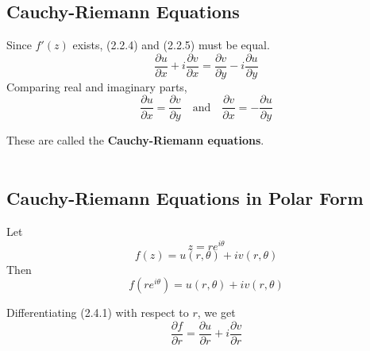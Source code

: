 \subsection{Cauchy-Riemann Equations}
Since $f'(z)$ exists, (2.2.4) and (2.2.5) must be equal.
\begin{equation}
    \frac{\partial u}{\partial x} + i\frac{\partial v}{\partial x} = \frac{\partial v}{\partial y} - i\frac{\partial u}{\partial y}
\end{equation}
Comparing real and imaginary parts,
\begin{equation}
    \boxed{ \frac{\partial u}{\partial x} = \frac{\partial v}{\partial y} }
    \quad \text{and} \quad 
    \boxed{ \frac{\partial v}{\partial x} = -\frac{\partial u}{\partial y} }
\end{equation}

These are called the \textbf{Cauchy-Riemann equations}. \\~\\


\subsection{Cauchy-Riemann Equations in Polar Form}
Let \[
    z = re^{i\theta}
\] \[
    f(z) = u(r,\theta) + iv(r,\theta)
\] 
Then
\begin{equation}
    f(re^{i\theta}) = u(r,\theta) + iv(r,\theta)
\end{equation}

Differentiating (2.4.1) with respect to $r$, we get
\begin{equation}
    \frac{\partial f}{\partial r} = \frac{\partial u}{\partial r} + i\frac{\partial v}{\partial r}
\end{equation}
